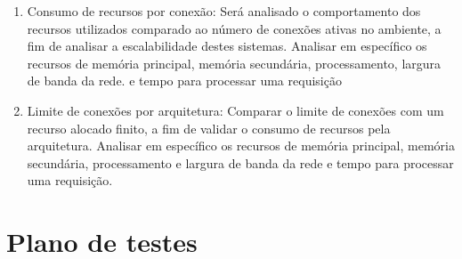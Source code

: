 \begin{enumerate}
  \item Consumo de recursos por conexão: Será analisado o comportamento dos recursos utilizados comparado ao número de conexões ativas no ambiente, a fim de analisar a escalabilidade destes sistemas. Analisar em específico os recursos de memória principal, memória secundária, processamento, largura de banda da rede. e tempo para processar uma requisição
  \item Limite de conexões por arquitetura: Comparar o limite de conexões com um recurso alocado finito, a fim de validar o consumo de recursos pela arquitetura. Analisar em específico os recursos de memória principal, memória secundária, processamento e largura de banda da rede e tempo para processar uma requisição.
\end{enumerate}

\section{Plano de testes}
\label{testes}
